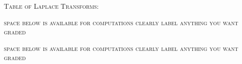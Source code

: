 \documentclass[11pt,reqno]{amsart}
\begin{document}
\newpage
\textsc{Table of Laplace Transforms}:

\addtolength{\jot}{3pt}



\addtolength{\jot}{-3pt}

\bigskip\bigskip

\noindent \hrulefill

\footnotesize \centerline{ \textsc{space below is available for computations \hspace{30mm} clearly label anything you want graded}}
\vfill

\newpage
\footnotesize \centerline{ \textsc{space below is available for computations \hspace{30mm} clearly label anything you want graded}}
\vfill
\end{document}
